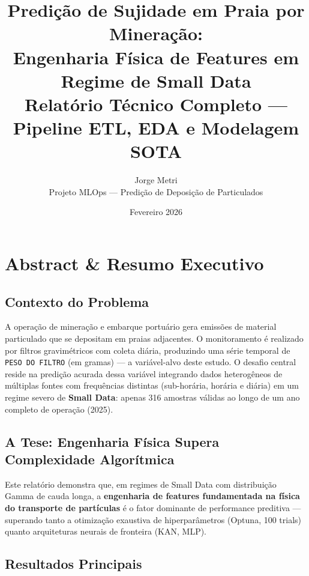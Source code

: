 \documentclass[12pt, a4paper]{article}
\title{%
    \textbf{Predição de Sujidade em Praia por Mineração:} \\[0.5em]
    \Large Engenharia Física de Features em Regime de Small Data \\[0.3em]
    \large Relatório Técnico Completo — Pipeline ETL, EDA e Modelagem SOTA
}
\author{
    Jorge Metri \\
    \small Projeto MLOps — Predição de Deposição de Particulados
}
\date{Fevereiro 2026}
\newcommand{\feature}[1]{\texttt{#1}}
\begin{document}
\maketitle

\tableofcontents
\newpage

\section{Abstract \& Resumo Executivo}
\label{sec:abstract}

\subsection{Contexto do Problema}

A operação de mineração e embarque portuário gera emissões de material
particulado que se depositam em praias adjacentes. O monitoramento é realizado
por filtros gravimétricos com coleta diária, produzindo uma série temporal de
\feature{PESO DO FILTRO} (em gramas) — a variável-alvo deste estudo. O desafio
central reside na predição acurada dessa variável integrando dados heterogêneos
de múltiplas fontes com frequências distintas (sub-horária, horária e diária)
em um regime severo de \textbf{Small Data}: apenas 316 amostras válidas ao
longo de um ano completo de operação (2025).

\subsection{A Tese: Engenharia Física Supera Complexidade Algorítmica}

Este relatório demonstra que, em regimes de Small Data com distribuição
Gamma de cauda longa, a \textbf{engenharia de features fundamentada na
física do transporte de partículas} é o fator dominante de performance
preditiva — superando tanto a otimização exaustiva de hiperparâmetros
(Optuna, 100 trials) quanto arquiteturas neurais de fronteira (KAN,
MLP).

\subsection{Resultados Principais}
\end{document}
